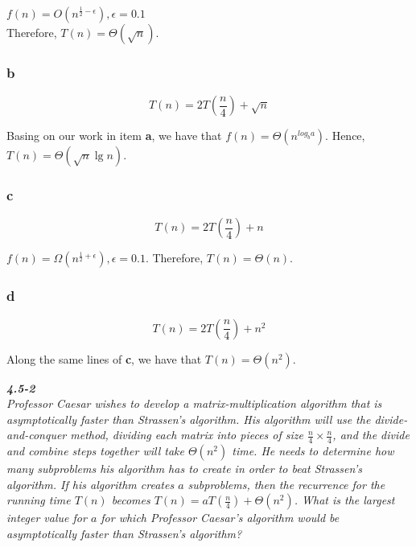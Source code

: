 \documentclass[8pt,a4paper]{article}
\begin{document}
$f(n) = O(n^{\frac{1}{2} - \epsilon}), \epsilon = 0.1$ \\

Therefore, $T(n) = \Theta(\sqrt{n})$.

\subsubsection*{b}

\begin{equation*}
	T(n) = 2T\left(\frac{n}{4}\right) + \sqrt{n}
\end{equation*}

Basing on our work in item \textbf{a}, we have that $f(n) = \Theta(n^{log_{b} a})$.
Hence, $T(n) = \Theta(\sqrt{n} \lg n)$.

\subsubsection*{c}

\begin{equation*}
	T(n) = 2T\left(\frac{n}{4}\right) + n
\end{equation*}

$f(n) = \Omega(n^{\frac{1}{2} + \epsilon}), \epsilon = 0.1$. Therefore, $T(n) = \Theta(n)$.

\subsubsection*{d}

\begin{equation*}
	T(n) = 2T\left(\frac{n}{4}\right) + n^{2}
\end{equation*}

Along the same lines of \textbf{c}, we have that $T(n) = \Theta(n^{2})$.

\begin{framed}
\textbf{\textit{4.5-2}} \\
\textit{Professor Caesar wishes to develop a matrix-multiplication algorithm that is
asymptotically faster than Strassen's  algorithm. His algorithm will use the divide-
and-conquer method, dividing each matrix into pieces of size $\frac{n}{4} \times \frac{n}{4}$,
and the divide and combine steps together will take $\Theta(n^{2})$ time. He needs
to determine how many subproblems his algorithm has to create in order to beat
Strassen's algorithm. If his algorithm creates $a$ subproblems, then the recurrence
for the running time $T(n)$ becomes $T(n) = aT(\frac{n}{4}) + \Theta(n^{2})$. What
is the largest integer value for $a$ for which Professor Caesar's algorithm would
be asymptotically faster than Strassen's algorithm?}
\end{framed}
\end{document}
